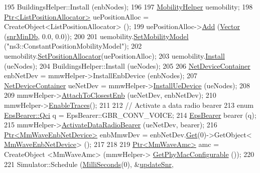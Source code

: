 \begin{DoxyCode}
195   BuildingsHelper::Install (enbNodes);
196 
197   \hyperlink{classns3_1_1MobilityHelper}{MobilityHelper} uemobility;
198   \hyperlink{classns3_1_1Ptr}{Ptr<ListPositionAllocator>} uePositionAlloc = 
      CreateObject<ListPositionAllocator> ();
199   uePositionAlloc->\hyperlink{classns3_1_1ListPositionAllocator_a460e82f015ac012a73ba0ea0cccb3486}{Add} (\hyperlink{classns3_1_1Vector3D_a7e59b47bc94c9cb1dadff68c1d0112d8}{Vector} (\hyperlink{mmwave-amc-test_8cc_af0063dbe3d5a0aed58f51664f3dbf7c5}{snrMinDb}, 0.0, 0.0));
200 
201   uemobility.\hyperlink{classns3_1_1MobilityHelper_a030275011b6f40682e70534d30280aba}{SetMobilityModel} (\textcolor{stringliteral}{"ns3::ConstantPositionMobilityModel"});
202   uemobility.\hyperlink{classns3_1_1MobilityHelper_ac59d5295076be3cc11021566713a28c5}{SetPositionAllocator}(uePositionAlloc);
203   uemobility.\hyperlink{classns3_1_1MobilityHelper_a07737960ee95c0777109cf2994dd97ae}{Install} (ueNodes);
204   BuildingsHelper::Install (ueNodes);
205 
206   \hyperlink{classns3_1_1NetDeviceContainer}{NetDeviceContainer} enbNetDev = mmwHelper->InstallEnbDevice (enbNodes);
207   \hyperlink{classns3_1_1NetDeviceContainer}{NetDeviceContainer} ueNetDev = mmwHelper->\hyperlink{classns3_1_1MmWaveHelper_a9311c819d7ee539c8710c5b7e98df37a}{InstallUeDevice} (ueNodes);
208 
209   mmwHelper->\hyperlink{classns3_1_1MmWaveHelper_a202baea67b0af0d4fb6069de73766dc6}{AttachToClosestEnb} (ueNetDev, enbNetDev);
210   mmwHelper->\hyperlink{classns3_1_1MmWaveHelper_a4eae3871876b62965d612d9a56ed21bc}{EnableTraces}();
211 
212   \textcolor{comment}{// Activate a data radio bearer}
213   \textcolor{keyword}{enum} \hyperlink{structns3_1_1EpsBearer_aecf0c67109c5eb4ec0b07226fff5885e}{EpsBearer::Qci} q = EpsBearer::GBR\_CONV\_VOICE;
214   \hyperlink{structns3_1_1EpsBearer}{EpsBearer} bearer (q);
215   mmwHelper->\hyperlink{classns3_1_1MmWaveHelper_a9178ae3493484a9582039bb14edb282a}{ActivateDataRadioBearer} (ueNetDev, bearer);
216   \hyperlink{classns3_1_1Ptr}{Ptr<MmWaveEnbNetDevice>} enbMmwDev = enbNetDev.\hyperlink{classns3_1_1NetDeviceContainer_a677d62594b5c9d2dea155cc5045f4d0b}{Get}(0)->GetObject<
      \hyperlink{classns3_1_1MmWaveEnbNetDevice}{MmWaveEnbNetDevice}> ();
217 
218 
219         \hyperlink{classns3_1_1Ptr}{Ptr<MmWaveAmc>} amc = CreateObject <MmWaveAmc> (mmwHelper->
      \hyperlink{classns3_1_1MmWaveHelper_ab4f7b3fad4e6c58765c1023e36952c1b}{GetPhyMacConfigurable} ());
220 
221   Simulator::Schedule (\hyperlink{group__timecivil_gaf26127cf4571146b83a92ee18679c7a9}{MilliSeconds}(0), &\hyperlink{mmwave-amc-test_8cc_acbc789d09623d926a18a031079a40297}{updateSnr}, 

\end{DoxyCode}

